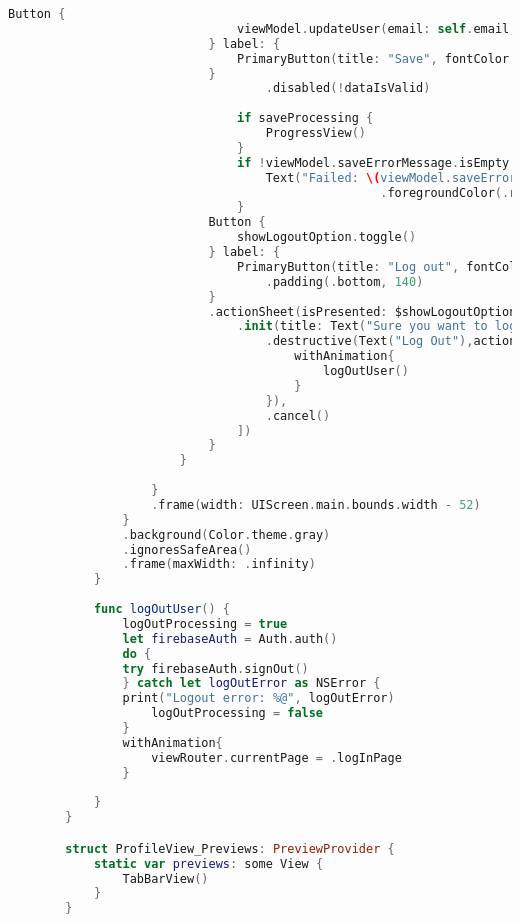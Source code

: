 \hspace{-10mm}
\begin{minipage}{\textwidth}
    \linespread{0.8}\selectfont
    \begin{lstlisting}[language=swift]
                        Button {
                                viewModel.updateUser(email: self.email, password: self.password, firstName: self.firstName, lastName: self.lastName)
                            } label: {
                                PrimaryButton(title: "Save", fontColor: Color.theme.white, backgroundColor: buttonColor)
                            }
                                    .disabled(!dataIsValid)
                            
                                if saveProcessing {
                                    ProgressView()
                                }
                                if !viewModel.saveErrorMessage.isEmpty {
                                    Text("Failed: \(viewModel.saveErrorMessage)")
                                                    .foregroundColor(.red)
                                }
                            Button {
                                showLogoutOption.toggle()
                            } label: {
                                PrimaryButton(title: "Log out", fontColor: Color.theme.white, backgroundColor: Color.theme.red)
                                    .padding(.bottom, 140)
                            }
                            .actionSheet(isPresented: $showLogoutOption){
                                .init(title: Text("Sure you want to log out?"),buttons: [
                                    .destructive(Text("Log Out"),action: {
                                        withAnimation{
                                            logOutUser()
                                        }
                                    }),
                                    .cancel()
                                ])
                            }
                        }
                        
                    }
                    .frame(width: UIScreen.main.bounds.width - 52)
                }
                .background(Color.theme.gray)
                .ignoresSafeArea()
                .frame(maxWidth: .infinity)
            }
            
            func logOutUser() {
                logOutProcessing = true
                let firebaseAuth = Auth.auth()
                do {
                try firebaseAuth.signOut()
                } catch let logOutError as NSError {
                print("Logout error: %@", logOutError)
                    logOutProcessing = false
                }
                withAnimation{
                    viewRouter.currentPage = .logInPage
                }
            
            }
        }

        struct ProfileView_Previews: PreviewProvider {
            static var previews: some View {
                TabBarView()
            }
        }
    \end{lstlisting}   
\end{minipage}

